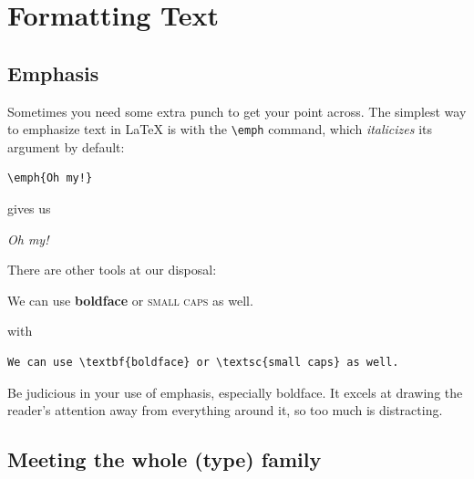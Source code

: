 \chapter{Formatting Text}
\label{formatting}

\section{Emphasis}

Sometimes you need some extra punch to get your point across.
The simplest way to emphasize text in \LaTeX{} is with the \verb|\emph| command,
which \emph{italicizes} its argument by default:
\begin{leftfigure}
\begin{lstlisting}
\emph{Oh my!}
\end{lstlisting}
\end{leftfigure}
gives us
\begin{leftfigure}
\lm \emph{Oh my!}
\end{leftfigure}
There are other tools at our disposal:
\begin{leftfigure}
\lm We can use \textbf{boldface} or \textsc{small caps} as well.
\end{leftfigure}
with
\begin{leftfigure}
\begin{lstlisting}
We can use \textbf{boldface} or \textsc{small caps} as well.
\end{lstlisting}
\end{leftfigure}
Be judicious in your use of emphasis, especially boldface.
It excels at drawing the reader's attention away from everything around it,
so too much is distracting.

\section{Meeting the whole (type) family}

